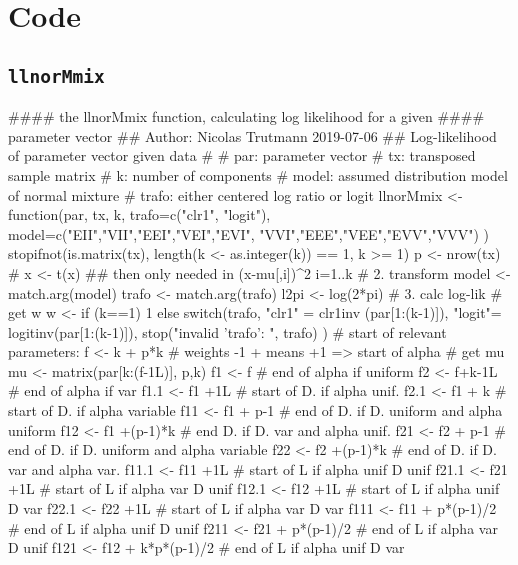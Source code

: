 \chapter{\Rp Code}
\section{{\tt llnorMmix}}

\begin{Schunk}
\begin{Soutput}
#### the llnorMmix function, calculating log likelihood for a given
#### parameter vector
## Author: Nicolas Trutmann 2019-07-06
## Log-likelihood of parameter vector given data
#
# par:   parameter vector
# tx:    transposed sample matrix
# k:     number of components
# model: assumed distribution model of normal mixture
# trafo: either centered log ratio or logit
llnorMmix <- function(par, tx, k,
                      trafo=c("clr1", "logit"),
                      model=c("EII","VII","EEI","VEI","EVI",
                              "VVI","EEE","VEE","EVV","VVV")
                      )
{
    stopifnot(is.matrix(tx),
              length(k <- as.integer(k)) == 1, k >= 1)
    p <- nrow(tx)
#    x <- t(x) ## then only needed in   (x-mu[,i])^2  i=1..k
    # 2. transform
    model <- match.arg(model)
    trafo <- match.arg(trafo)
    l2pi <- log(2*pi)
    # 3. calc log-lik
    # get w
    w <- if (k==1) 1
         else switch(trafo,
                     "clr1" = clr1inv (par[1:(k-1)]),
                     "logit"= logitinv(par[1:(k-1)]),
                     stop("invalid 'trafo': ", trafo)
         )
    # start of relevant parameters:
    f <- k + p*k # weights -1 + means +1 => start of alpha
    # get mu
    mu <- matrix(par[k:(f-1L)], p,k)
    f1 <- f      # end of alpha if uniform
    f2 <- f+k-1L # end of alpha if var
    f1.1 <- f1 +1L # start of D. if alpha unif.
    f2.1 <- f1 + k # start of D. if alpha variable
    f11 <- f1 + p-1    # end of D. if D. uniform and alpha uniform
    f12 <- f1 +(p-1)*k # end    D. if D.   var   and alpha unif.
    f21 <- f2 + p-1    # end of D. if D. uniform and alpha variable
    f22 <- f2 +(p-1)*k # end of D. if D.   var   and alpha var.
    f11.1 <- f11 +1L # start of L if alpha unif  D unif
    f21.1 <- f21 +1L # start of L if alpha var   D unif
    f12.1 <- f12 +1L # start of L if alpha unif  D var
    f22.1 <- f22 +1L # start of L if alpha var   D var
    f111 <- f11 +   p*(p-1)/2 # end of L if alpha unif  D unif
    f211 <- f21 +   p*(p-1)/2 # end of L if alpha var   D unif
    f121 <- f12 + k*p*(p-1)/2 # end of L if alpha unif  D var
}
\end{Soutput}
\end{Schunk}
